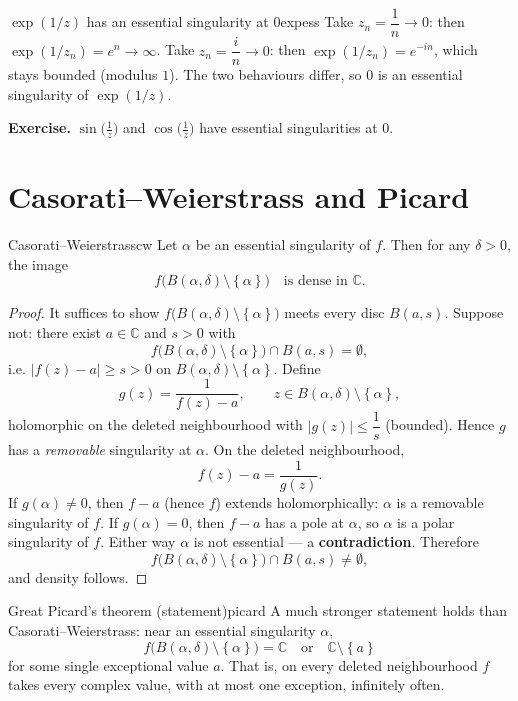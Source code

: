 \documentclass[11pt,openany]{report}
\newcommand{\C}{\mathbb{C}}
\newcommand{\abs}[1]{\left\lvert #1 \right\rvert}
\newcommand{\set}[1]{\left\{ #1 \right\}}
\begin{document}
\begin{example}{$\exp(1/z)$ has an essential singularity at $0$}{expess}
Take $z_n=\dfrac1n\to0$: then $\exp(1/z_n)=e^{n}\to\infty$. Take $z_n=\dfrac{i}{n}\to0$:
then $\exp(1/z_n)=e^{-in}$, which stays bounded (modulus $1$). The two behaviours differ,
so $0$ is an essential singularity of $\exp(1/z)$.
\end{example}

\begin{remark}
\textbf{Exercise.} $\sin\!\big(\tfrac1z\big)$ and $\cos\!\big(\tfrac1z\big)$ have essential
singularities at $0$.
\end{remark}

\section{Casorati--Weierstrass and Picard}

\begin{theorem}{Casorati--Weierstrass}{cw}
Let $\alpha$ be an essential singularity of $f$. Then for any $\delta>0$, the image
\[
  f\bigl(B(\alpha,\delta)\setminus\set\alpha\bigr) \quad\text{is dense in } \C .
\]
\end{theorem}

\begin{proof}
It suffices to show $f\bigl(B(\alpha,\delta)\setminus\set\alpha\bigr)$ meets every disc
$B(a,s)$. Suppose not: there exist $a\in\C$ and $s>0$ with
\[
  f\bigl(B(\alpha,\delta)\setminus\set\alpha\bigr)\cap B(a,s) = \emptyset,
\]
i.e. $\abs{f(z)-a}\ge s>0$ on $B(\alpha,\delta)\setminus\set\alpha$. Define
\[
  g(z) = \frac{1}{f(z)-a}, \qquad z\in B(\alpha,\delta)\setminus\set\alpha,
\]
holomorphic on the deleted neighbourhood with $\abs{g(z)}\le\dfrac1s$ (bounded). Hence $g$
has a \emph{removable} singularity at $\alpha$. On the deleted neighbourhood,
\[
  f(z) - a = \frac{1}{g(z)}.
\]
If $g(\alpha)\ne0$, then $f-a$ (hence $f$) extends holomorphically: $\alpha$ is a
removable singularity of $f$. If $g(\alpha)=0$, then $f-a$ has a pole at $\alpha$, so
$\alpha$ is a polar singularity of $f$. Either way $\alpha$ is not essential --- a
\textbf{contradiction}. Therefore
\[
  f\bigl(B(\alpha,\delta)\setminus\set\alpha\bigr)\cap B(a,s) \ne \emptyset,
\]
and density follows.
\end{proof}

\begin{theorem}{Great Picard's theorem (statement)}{picard}
A much stronger statement holds than Casorati--Weierstrass: near an essential singularity
$\alpha$,
\[
  f\bigl(B(\alpha,\delta)\setminus\set\alpha\bigr) = \C \quad\text{or}\quad \C\setminus\set{a}
\]
for some single exceptional value $a$. That is, on every deleted neighbourhood $f$ takes
every complex value, with at most one exception, infinitely often.
\end{theorem}
\end{document}
